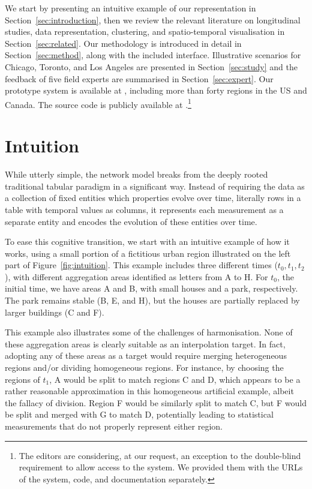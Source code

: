 We start by presenting an intuitive example of our representation in
Section~\ref{sec:introduction}, then we review the relevant literature on
longitudinal studies, data representation, clustering, and spatio-temporal
visualisation in Section~\ref{sec:related}. Our methodology is introduced in
detail in Section~\ref{sec:method}, along with the included interface.
Illustrative scenarios for Chicago, Toronto, and Los Angeles are presented in
Section~\ref{sec:study} and the feedback of five field experts are summarised in
Section~\ref{sec:expert}. Our prototype system is available at
, including more than forty regions in the
US and Canada. The source code is publicly available at
.\footnote{The editors are
considering, at our request, an exception to the double-blind requirement to
allow access to the system. We provided them with the URLs of the system, code,
and documentation separately.}


\section{Intuition}
\label{sec:intuition}
While utterly simple, the network model breaks from the deeply rooted
traditional tabular paradigm in a significant way. Instead of requiring the data
as a collection of fixed entities which properties evolve over time, literally
rows in a table with temporal values as columns, it represents each measurement
as a separate entity and encodes the evolution of these entities over time.

To ease this cognitive transition, we start with an intuitive example of how it
works, using a small portion of a fictitious urban region illustrated on the
left part of Figure~\ref{fig:intuition}. This example includes three different
times ($t_0,t_1,t_2$), with different aggregation areas identified as letters
from A to H. For $t_0$, the initial time, we have areas A and B, with small
houses and a park, respectively. The park remains stable (B, E, and H), but the
houses are partially replaced by larger buildings (C and F). 

This example also illustrates some of the challenges of harmonisation. None of
these aggregation areas is clearly suitable as an interpolation target. In fact,
adopting any of these areas as a target would require merging heterogeneous
regions and/or dividing homogeneous regions. For instance, by choosing the
regions of $t_1$, A would be split to match regions C and D, which appears to be
a rather reasonable approximation in this homogeneous artificial example, albeit
the fallacy of division. Region F would be similarly split to match C, but F
would be split and merged with G to match D, potentially leading to statistical
measurements that do not properly represent either region. 

